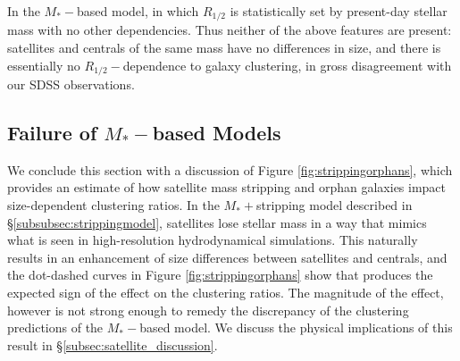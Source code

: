 \documentclass[usenatbib,usegraphicx,letterpaper]{mn2e}
\newcommand{\rhalf}{R_{1/2}}
\newcommand{\mstar}{M_{\ast}}
\begin{document}
In the $\mstar-$based model, in which $\rhalf$ is statistically set by present-day stellar mass with no other dependencies. Thus neither of the above features are present: satellites and centrals of the same mass have no differences in size, and there is essentially no $\rhalf-$dependence to galaxy clustering, in gross disagreement with our SDSS observations.


\subsection{Failure of $\mstar-$based Models}
\label{subsec:orphan_stripping}

We conclude this section with a discussion of Figure \ref{fig:strippingorphans}, which provides an estimate of how satellite mass stripping and orphan galaxies impact size-dependent clustering ratios. In the $\mstar+$stripping model described in \S\ref{subsubsec:strippingmodel}, satellites lose stellar mass in a way that mimics what is seen in high-resolution hydrodynamical simulations. This naturally results in an enhancement of size differences between satellites and centrals, and the dot-dashed curves in Figure \ref{fig:strippingorphans} show that produces the expected sign of the effect on the clustering ratios. The magnitude of the effect, however is not strong enough to remedy the discrepancy of the clustering predictions of the $\mstar-$based model. We discuss the physical implications of this result in \S\ref{subsec:satellite_discussion}.
\end{document}
